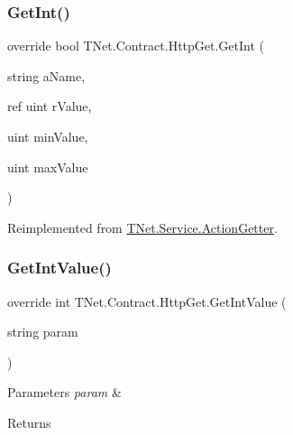 \subsubsection{\texorpdfstring{Get\+Int()}{GetInt()}\hspace{0.1cm}{\footnotesize\ttfamily [5/5]}}
{\footnotesize\ttfamily override bool T\+Net.\+Contract.\+Http\+Get.\+Get\+Int (\begin{DoxyParamCaption}\item[{string}]{a\+Name,  }\item[{ref uint}]{r\+Value,  }\item[{uint}]{min\+Value,  }\item[{uint}]{max\+Value }\end{DoxyParamCaption})\hspace{0.3cm}{\ttfamily [virtual]}}







Reimplemented from \mbox{\hyperlink{class_t_net_1_1_service_1_1_action_getter_a32dcd451275e8f7fe20e711ceac96f4b}{T\+Net.\+Service.\+Action\+Getter}}.

\mbox{\label{class_t_net_1_1_contract_1_1_http_get_a0ad6bffa55b113fc8960d8e10ed6a531}} 
\subsubsection{\texorpdfstring{Get\+Int\+Value()}{GetIntValue()}\hspace{0.1cm}{\footnotesize\ttfamily [1/2]}}
{\footnotesize\ttfamily override int T\+Net.\+Contract.\+Http\+Get.\+Get\+Int\+Value (\begin{DoxyParamCaption}\item[{string}]{param }\end{DoxyParamCaption})\hspace{0.3cm}{\ttfamily [virtual]}}






\begin{DoxyParams}{Parameters}
{\em param} & \\
\hline
\end{DoxyParams}
\begin{DoxyReturn}{Returns}

\end{DoxyReturn}


